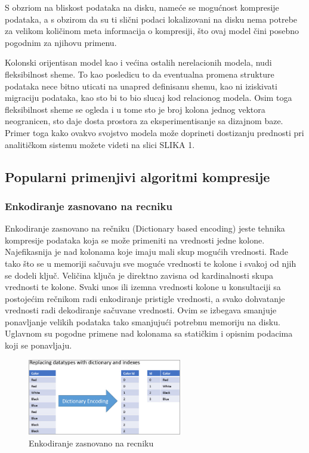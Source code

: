 \documentclass[12pt,oneside]{memoir}
\begin{document}
S obzriom na bliskost   podataka na disku, nameće se mogućnost kompresije podataka, a s obzirom da su ti slični podaci lokalizovani na disku nema potrebe za velikom količinom meta informacija o kompresiji, što ovaj model čini posebno pogodnim za njihovu primenu.

Kolonski orijentisan model kao i većina ostalih nerelacionih modela, nudi fleksibilnost sheme. To kao posledicu to da eventualna promena strukture podataka nece bitno uticati na unapred definisanu shemu, kao ni iziskivati migraciju podataka, kao sto bi to bio slucaj kod relacionog modela. Osim toga fleksibilnost sheme se ogleda i u tome sto je broj kolona jednog vektora neogranicen, sto daje dosta prostora za eksperimentisanje sa dizajnom baze. Primer toga kako ovakvo svojstvo modela može doprineti dostizanju prednosti pri analitičkom sistemu možete videti na slici SLIKA 1. 

\subsection{Popularni primenjivi algoritmi kompresije}
\cite{ColumnarOptimizations}
\subsubsection{Enkodiranje zasnovano na recniku}

Enkodiranje zasnovano na rečniku (Dictionary based encoding) jeste tehnika kompresije podataka koja se može primeniti na vrednosti jedne kolone. Najefikasnija je nad kolonama koje imaju mali skup mogućih vrednosti. Rade tako što se u memoriji sačuvaju sve moguće vrednosti te kolone i svakoj od njih se dodeli ključ. Veličina ključa je direktno zavisna od kardinalnosti skupa vrednosti te kolone. Svaki unos ili izemna vrednosti kolone u konsultaciji sa postojećim rečnikom radi enkodiranje pristigle vrednosti, a svako dohvatanje vrednosti radi dekodiranje sačuvane vrednosti. Ovim se izbegava smanjuje ponavljanje velikih podataka tako smanjujući potrebnu memoriju na disku. Uglavnom su pogodne primene nad kolonama sa statičkim i opisnim podacima koji se ponavljaju.
\begin{figure}[!ht]
  \centering
  \includegraphics[width=0.6\textwidth]{DictionaryEncoding.jpg}
  \caption{Enkodiranje zasnovano na recniku}
  \label{fig:grafikon}
\end{figure}
\end{document}
